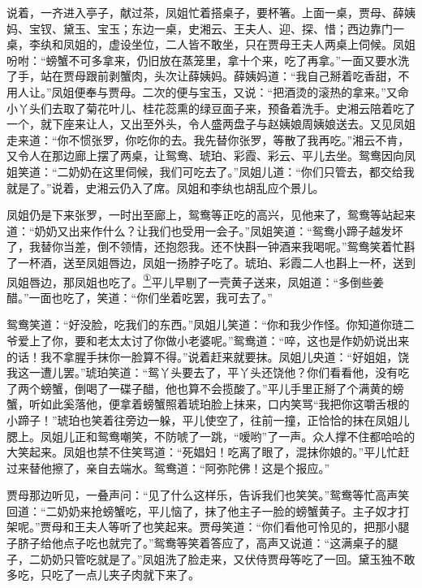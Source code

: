 说着，一齐进入亭子，献过茶，凤姐忙着搭桌子，要杯箸。上面一桌，贾母、薛姨妈、宝钗、黛玉、宝玉；东边一桌，史湘云、王夫人、迎、探、惜；西边靠门一桌，李纨和凤姐的，虚设坐位，二人皆不敢坐，只在贾母王夫人两桌上伺候。凤姐吩咐：``螃蟹不可多拿来，仍旧放在蒸笼里，拿十个来，吃了再拿。''一面又要水洗了手，站在贾母跟前剥蟹肉，头次让薛姨妈。薛姨妈道：``我自己掰着吃香甜，不用人让。''凤姐便奉与贾母。二次的便与宝玉，又说：``把酒烫的滚热的拿来。''又命小丫头们去取了菊花叶儿、桂花蕊熏的绿豆面子来，预备着洗手。史湘云陪着吃了一个，就下座来让人，又出至外头，令人盛两盘子与赵姨娘周姨娘送去。又见凤姐走来道：``你不惯张罗，你吃你的去。我先替你张罗，等散了我再吃。''湘云不肯，又令人在那边廊上摆了两桌，让鸳鸯、琥珀、彩霞、彩云、平儿去坐。鸳鸯因向凤姐笑道：``二奶奶在这里伺候，我们可吃去了。''凤姐儿道：``你们只管去，都交给我就是了。''说着，史湘云仍入了席。凤姐和李纨也胡乱应个景儿。

凤姐仍是下来张罗，一时出至廊上，鸳鸯等正吃的高兴，见他来了，鸳鸯等站起来道：``奶奶又出来作什么？让我们也受用一会子。''凤姐笑道：``鸳鸯小蹄子越发坏了，我替你当差，倒不领情，还抱怨我。还不快斟一钟酒来我喝呢。''鸳鸯笑着忙斟了一杯酒，送至凤姐唇边，凤姐一扬脖子吃了。琥珀、彩霞二人也斟上一杯，送到凤姐唇边，那凤姐也吃了。\href{../Text/part0042_split_000.html\#lnkback_1_a}{\textsuperscript{①}}平儿早剔了一壳黄子送来，凤姐道：``多倒些姜醋。''一面也吃了，笑道：``你们坐着吃罢，我可去了。''

鸳鸯笑道：``好没脸，吃我们的东西。''凤姐儿笑道：``你和我少作怪。你知道你琏二爷爱上了你，要和老太太讨了你做小老婆呢。''鸳鸯道：``啐，这也是作奶奶说出来的话！我不拿腥手抹你一脸算不得。''说着赶来就要抹。凤姐儿央道：``好姐姐，饶我这一遭儿罢。''琥珀笑道：``鸳丫头要去了，平丫头还饶他？你们看看他，没有吃了两个螃蟹，倒喝了一碟子醋，他也算不会揽酸了。''平儿手里正掰了个满黄的螃蟹，听如此奚落他，便拿着螃蟹照着琥珀脸上抹来，口内笑骂``我把你这嚼舌根的小蹄子！''琥珀也笑着往旁边一躲，平儿使空了，往前一撞，正恰恰的抹在凤姐儿腮上。凤姐儿正和鸳鸯嘲笑，不防唬了一跳，``嗳哟''了一声。众人撑不住都哈哈的大笑起来。凤姐也禁不住笑骂道：``死娼妇！吃离了眼了，混抹你娘的。''平儿忙赶过来替他擦了，亲自去端水。鸳鸯道：``阿弥陀佛！这是个报应。''

贾母那边听见，一叠声问：``见了什么这样乐，告诉我们也笑笑。''鸳鸯等忙高声笑回道：``二奶奶来抢螃蟹吃，平儿恼了，抹了他主子一脸的螃蟹黄子。主子奴才打架呢。''贾母和王夫人等听了也笑起来。贾母笑道：``你们看他可怜见的，把那小腿子脐子给他点子吃也就完了。''鸳鸯等笑着答应了，高声又说道：``这满桌子的腿子，二奶奶只管吃就是了。''凤姐洗了脸走来，又伏侍贾母等吃了一回。黛玉独不敢多吃，只吃了一点儿夹子肉就下来了。


